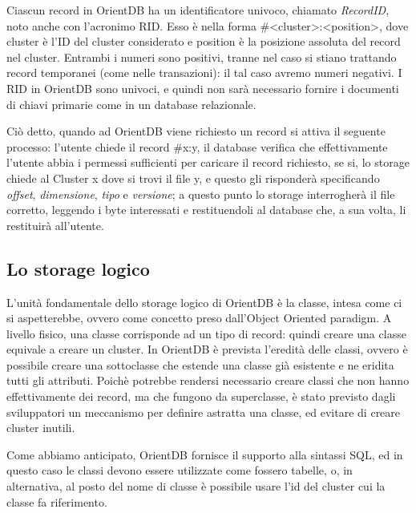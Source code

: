 Ciascun record in OrientDB ha un identificatore univoco, chiamato \emph{RecordID}, noto anche con l'acronimo RID. Esso è nella forma \#<cluster>:<position>, dove cluster è l'ID del cluster considerato e position è la posizione assoluta del record nel cluster. Entrambi i numeri sono positivi, tranne nel caso si stiano trattando record temporanei (come nelle transazioni): il tal caso avremo numeri negativi. I RID in OrientDB sono univoci, e quindi non sarà necessario fornire i documenti di chiavi primarie come in un database relazionale.

Ciò detto, quando ad OrientDB viene richiesto un record si attiva il seguente processo: l'utente chiede il record \#x:y, il database verifica che effettivamente l'utente abbia i permessi sufficienti per caricare il record richiesto, se si, lo storage chiede al Cluster x dove si trovi il file y, e questo gli risponderà specificando \emph{offset}, \emph{dimensione}, \emph{tipo} e \emph{versione}; a questo punto lo storage interrogherà il file corretto, leggendo i byte interessati e restituendoli al database che, a sua volta, li restituirà all'utente.

\subsection{Lo storage logico}
L'unità fondamentale dello storage logico di OrientDB è la classe, intesa come ci si aspetterebbe, ovvero come concetto preso dall'Object
Oriented paradigm. A livello fisico, una classe corrisponde ad un tipo di record: quindi creare una classe equivale a creare un cluster.
In OrientDB è prevista l'eredità delle classi, ovvero è possibile creare una sottoclasse che estende una classe già esistente e ne eridita tutti gli attributi. Poichè potrebbe rendersi necessario creare classi che non hanno effettivamente dei record, ma che fungono da superclasse, è stato previsto dagli sviluppatori un meccanismo per definire astratta una classe, ed evitare di creare cluster inutili.

Come abbiamo anticipato, OrientDB fornisce il supporto alla sintassi SQL, ed in questo caso le classi devono essere utilizzate come fossero tabelle, o, in alternativa, al posto del nome di classe è possibile usare l'id del cluster cui la classe fa riferimento.

